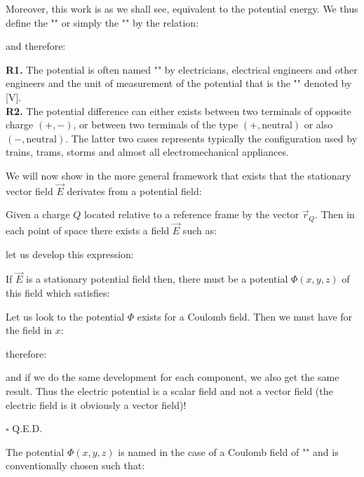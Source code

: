 	Moreover, this work is as we shall see, equivalent to the potential energy. We thus define the "" or simply the "" by the relation:
	
	and therefore:
	
	\begin{tcolorbox}[title=Remarks,colframe=black,arc=10pt]
	\textbf{R1.} The potential is often named "" by electricians, electrical engineers and other engineers and the unit of measurement of the potential that is the "" denoted by [V].\\
	
	\textbf{R2.} The potential difference can either exists between two terminals of opposite charge $(+, -)$, or between two terminals of the type $(+, \text{neutral})$ or also $(-, \text{neutral})$. The latter two cases represents typically the configuration used by trains, trams, storms and almost all electromechanical appliances.
	\end{tcolorbox}
	\begin{theorem}
	We will now show in the more general framework that exists that the stationary vector field $\vec{E}$ derivates from a potential field:
	\end{theorem}
	\begin{dem}
	Given a charge $Q$ located relative to a reference frame by the vector $\vec{r}_Q$. Then in each point of space there exists a field $\vec{E}$ such as:
	
	let us develop this expression:
	
	If $\vec{E}$ is a stationary potential field then, there must be a potential $\Phi(x,y,z)$ of this field which satisfies:
	
	Let us look to the potential $\Phi$ exists for a Coulomb field. Then we must have for the field in $x$:
	
	therefore:
	
	and if we do the same development for each component, we also get the same result. Thus the electric potential is a scalar field and not a vector field (the electric field is it obviously a vector field)!
	\begin{flushright}
		$\square$  Q.E.D.
	\end{flushright}
	\end{dem}
	The potential $\Phi(x,y,z)$ is named in the case of a Coulomb field of "" and is conventionally chosen such that:
	
